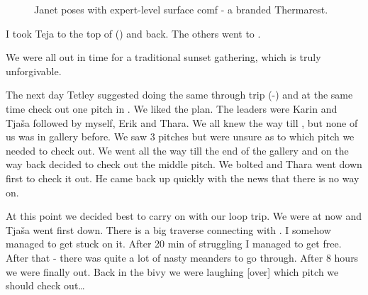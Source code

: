 \begin{figure}[b!]
\checkoddpage \ifoddpage \forcerectofloat \else \forceversofloat \fi
{}
\caption{Janet poses with expert-level surface comf - a branded Thermarest. }
\label{thermarest}
\end{figure}


I took Teja to the top of  () and back. The others went to
.

We were all out in time for a traditional sunset gathering, which is
truly unforgivable.

The next day Tetley suggested doing the same through trip
(-) and at the same time check out one pitch in .
We liked the plan. The leaders were Karin and Tjaša followed by myself,
Erik and Thara. We all knew the way till , but none of us
was in  gallery before. We saw 3 pitches but were unsure as to
which pitch we needed to check out. We went all the way till the end of
the gallery and on the way back decided to check out the middle pitch.
We bolted and Thara went down first to check it out. He came back up
quickly with the news that there is no way on.


At this point we decided
best to carry on with our loop trip. We were at  now and
Tjaša went first down. There is a big traverse connecting 
with . I somehow managed to get stuck on it. After 20 min of
struggling I managed to get free. After that  - there was quite
a lot of nasty meanders to go through. After 8 hours we were finally
out. Back in the bivy we were laughing [over] which pitch we should check
out\ldots{}

